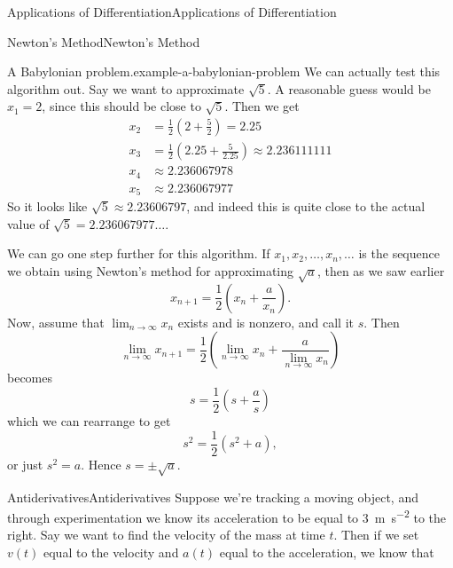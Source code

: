\documentclass[10pt,]{book}
\numberwithin{equation}{section}
\begin{document}
\begin{chapterptx}{Applications of Differentiation}{}{Applications of Differentiation}{}{}
\begin{sectionptx}{Newton's Method}{}{Newton's Method}{}{}
\begin{example}{A Babylonian problem.}{example-a-babylonian-problem}
We can actually test this algorithm out. Say we want to approximate \(\sqrt{5}\). A reasonable guess would be \(x_{1} = 2\), since this should be close to \(\sqrt{5}\). Then we get%
\begin{align*}
x_{2} & = \frac{1}{2}\left(2 + \frac{5}{2}\right) = 2.25 \\
x_{3} & = \frac{1}{2}\left(2.25 + \frac{5}{2.25}\right) \approx 2.236111111 \\
x_{4} & \approx 2.236067978 \\
x_{5} & \approx 2.236067977 
\end{align*}
So it looks like \(\sqrt{5}\approx 2.23606797\), and indeed this is quite close to the actual value of \(\sqrt{5} = 2.236067977\ldots\).%
\par
\hypertarget{p-376}{}%
We can go one step further for this algorithm. If \(x_{1},x_{2},\ldots,x_{n},\ldots\) is the sequence we obtain using Newton's method for approximating \(\sqrt{a}\), then as we saw earlier%
\begin{equation*}
x_{n+1} = \frac{1}{2}\left(x_{n} + \frac{a}{x_{n}}\right).
\end{equation*}
Now, assume that \(\lim_{n\to\infty}x_{n}\) exists and is nonzero, and call it \(s\). Then%
\begin{equation*}
\lim_{n\to\infty}x_{n+1} = \frac{1}{2}\left(\lim_{n\to\infty}x_{n} + \frac{a}{\lim_{n\to\infty}x_{n}}\right)
\end{equation*}
becomes%
\begin{equation*}
s = \frac{1}{2}\left(s + \frac{a}{s}\right)
\end{equation*}
which we can rearrange to get%
\begin{equation*}
s^{2} = \frac{1}{2}(s^{2} + a),
\end{equation*}
or just \(s^{2} = a\). Hence \(s = \pm\sqrt{a}\).%
\end{example}
\end{sectionptx}
%
%
\typeout{************************************************}
\typeout{************************************************}
%
\begin{sectionptx}{Antiderivatives}{}{Antiderivatives}{}{}\label{section-antiderivatives}
\hypertarget{p-377}{}%
Suppose we're tracking a moving object, and through experimentation we know its acceleration to be equal to \SI{3}{\meter\per\second\tothe{2}} to the right. Say we want to find the velocity of the mass at time \(t\). Then if we set \(v(t)\) equal to the velocity and \(a(t)\) equal to the acceleration, we know that%

\end{sectionptx}
\end{chapterptx}
\end{document}
